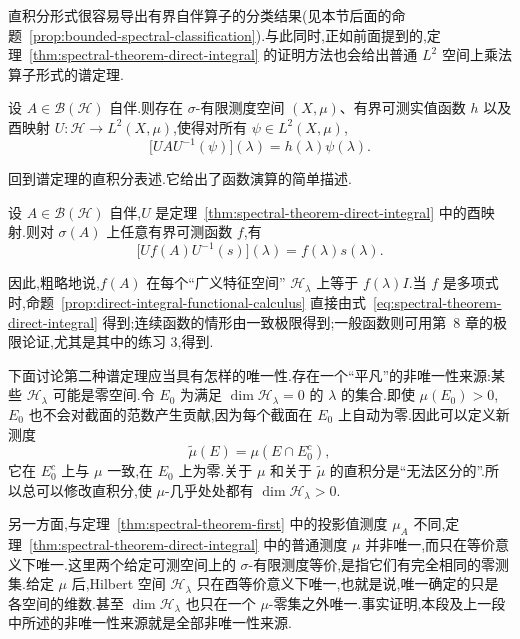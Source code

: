 {直积分形式很容易导出有界自伴算子的分类结果(见本节后面的命题~\ref{prop:bounded-spectral-classification}).与此同时,正如前面提到的,定理~\ref{thm:spectral-theorem-direct-integral} 的证明方法也会给出普通 \(L^{2}\) 空间上乘法算子形式的谱定理.

\begin{theorem}\label{thm:spectral-theorem-multiplication}
设 \(A\in\mathcal{B}(\mathcal{H})\) 自伴.则存在 \(\sigma\)-有限测度空间 \((X,\mu)\)、有界可测实值函数 \(h\) 以及酉映射 \(U:\mathcal{H}\to L^{2}(X,\mu)\),使得对所有 \(\psi\in L^{2}(X,\mu)\),
\[
\bigl[UAU^{-1}(\psi)\bigr](\lambda)=h(\lambda)\psi(\lambda).
\]
\end{theorem}

回到谱定理的直积分表述.它给出了函数演算的简单描述.

\begin{proposition}[直积分中的函数演算]\label{prop:direct-integral-functional-calculus}
设 \(A\in\mathcal{B}(\mathcal{H})\) 自伴,\(U\) 是定理~\ref{thm:spectral-theorem-direct-integral} 中的酉映射.则对 \(\sigma(A)\) 上任意有界可测函数 \(f\),有
\[
\bigl[Uf(A)U^{-1}(s)\bigr](\lambda)=f(\lambda)s(\lambda).
\label{eq:direct-integral-functional-calculus}
\]
\end{proposition}

因此,粗略地说,\(f(A)\) 在每个“广义特征空间” \(\mathcal{H}_{\lambda}\) 上等于 \(f(\lambda)I\).当 \(f\) 是多项式时,命题~\ref{prop:direct-integral-functional-calculus} 直接由式~\eqref{eq:spectral-theorem-direct-integral} 得到;连续函数的情形由一致极限得到;一般函数则可用第~8 章的极限论证,尤其是其中的练习 3,得到.

下面讨论第二种谱定理应当具有怎样的唯一性.存在一个“平凡”的非唯一性来源:某些 \(\mathcal{H}_{\lambda}\) 可能是零空间.令 \(E_{0}\) 为满足 \(\dim\mathcal{H}_{\lambda}=0\) 的 \(\lambda\) 的集合.即使 \(\mu(E_{0})>0\),\(E_{0}\) 也不会对截面的范数产生贡献,因为每个截面在 \(E_{0}\) 上自动为零.因此可以定义新测度
\[
\widetilde{\mu}(E)=\mu(E\cap E_{0}^{c}),
\]
它在 \(E_{0}^{c}\) 上与 \(\mu\) 一致,在 \(E_{0}\) 上为零.关于 \(\mu\) 和关于 \(\widetilde{\mu}\) 的直积分是“无法区分的”.所以总可以修改直积分,使 \(\mu\)-几乎处处都有 \(\dim\mathcal{H}_{\lambda}>0\).

另一方面,与定理~\ref{thm:spectral-theorem-first} 中的投影值测度 \(\mu_{A}\) 不同,定理~\ref{thm:spectral-theorem-direct-integral} 中的普通测度 \(\mu\) 并非唯一,而只在等价意义下唯一.这里两个给定可测空间上的 \(\sigma\)-有限测度等价,是指它们有完全相同的零测集.给定 \(\mu\) 后,Hilbert 空间 \(\mathcal{H}_{\lambda}\) 只在酉等价意义下唯一,也就是说,唯一确定的只是各空间的维数.甚至 \(\dim\mathcal{H}_{\lambda}\) 也只在一个 \(\mu\)-零集之外唯一.事实证明,本段及上一段中所述的非唯一性来源就是全部非唯一性来源.

}
